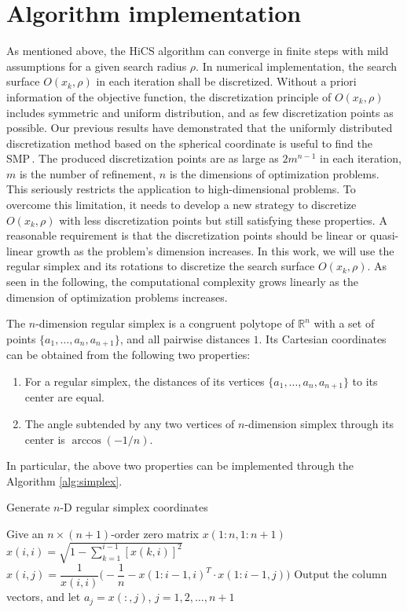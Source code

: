 \documentclass[final,1p,times]{elsarticle}
\begin{document}
\section{Algorithm implementation}
\label{sec:implement}

As mentioned above, the HiCS algorithm can converge in  
finite steps with mild assumptions for a given search radius $\rho$.
In numerical implementation, the search surface $O(x_k,\rho)$ in
each iteration shall be discretized.
Without a priori information of the objective function,
the discretization principle of $O(x_k,\rho)$
includes symmetric and uniform distribution, and as few
discretization points as possible.
Our previous results have demonstrated that the uniformly distributed
discretization method based on the spherical coordinate
is useful to find the SMP\,\cite{huang2017hill}. 
The produced discretization points are as large as $2m^{n-1}$ in
each iteration, $m$ is the number of refinement, $n$ is the dimensions of
optimization problems. This seriously restricts the
application to high-dimensional problems. 
To overcome this limitation, it needs to develop a new
strategy to discretize $O(x_k,\rho)$ with less discretization points
but still satisfying these properties.
A reasonable requirement is that the discretization points should be
linear or quasi-linear growth as the problem's dimension increases.
In this work, we will use the regular simplex and its rotations to
discretize the search surface $O(x_k,\rho)$. As seen in the following,
the computational complexity grows linearly as the
dimension of optimization problems increases.

The $n$-dimension regular simplex is a congruent polytope of
$\mathbb{R}^n$ with a set of points $\{a_1,\dots,a_n,a_{n+1}\}$,
and all pairwise distances $1$.
Its Cartesian coordinates can be obtained from the following two properties:
\begin{enumerate}
	\item For a regular simplex, the distances of its vertices 
		$\{a_1,\dots,a_n,a_{n+1}\}$ to its center are equal.
	\item The angle subtended by any two vertices of $n$-dimension simplex through its center is
		$\arccos(-1/n)$.
\end{enumerate}
In particular, the above two properties can be implemented
through the Algorithm \ref{alg:simplex}.
\begin{algorithm}
	\caption{Generate $n$-D regular simplex coordinates} 
	\label{alg:simplex}
\begin{algorithmic}
	\STATE Give an $n\times(n+1)$-order zero matrix $x(1:n,1:n+1)$
	\STATE $x(i,i)=\sqrt{1-\sum_{k=1}^{i-1} [x(k, i)]^{2}}$
		\STATE $x(i,j)
		=\dfrac{1}{x(i,i)}\Big(-\dfrac{1}{n}-x(1:i-1, i)^T \cdot
		x(1:i-1, j)\Big)$
		\ENDFOR
	\ENDFOR
	\STATE Output the column vectors, and let $a_j=x(:,j)$,
	$j=1,2,\dots,n+1$ 
\end{algorithmic}
\end{algorithm}
\end{document}

